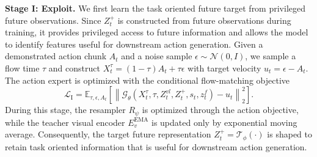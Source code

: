 \documentclass{article} %
\begin{document}
\textbf{Stage I: Exploit.}
We first learn the task oriented future target from privileged future
observations. Since $Z_t^{+}$ is constructed from future observations during
training, it provides privileged access to future information and allows the
model to identify features useful for downstream action generation. Given a
demonstrated action chunk $A_t$ and a noise sample
$\epsilon\sim\mathcal{N}(0,I)$, we sample a flow time $\tau$ and construct
$X_t^\tau=(1-\tau)A_t+\tau\epsilon$ with target velocity
$u_t=\epsilon-A_t$. The action expert is optimized with the conditional
flow-matching objective
\begin{equation}
    \mathcal{L}_{\mathrm{I}}
    =
    \mathbb{E}_{\tau,\epsilon,A_t}
    \left[
        \left\|
        \mathcal{G}_{\theta}
        \left(
            X_t^\tau,\tau,
            Z_t^{vl},Z_t^{+},s_t,z_t^f
        \right)
        -u_t
        \right\|_2^2
    \right].
\end{equation}
During this stage, the resampler $R_\psi$ is optimized through the action
objective, while the teacher visual encoder $E_v^{\mathrm{EMA}}$ is updated
only by exponential moving average. Consequently, the target future
representation $Z_t^{+}=\mathcal{T}_{\phi}(\cdot)$ is shaped to retain
task oriented information that is useful for downstream action generation.
\end{document}
